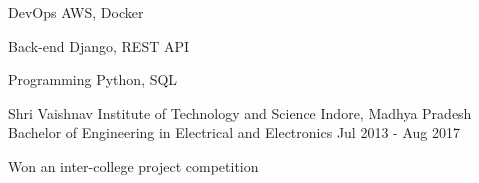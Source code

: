 \documentclass{my_resume}
\begin{document}
	\begin{cvskills}
		\cvskill
			{DevOps} %
			{AWS, Docker} %

		\cvskill
			{Back-end} %
			{Django, REST API} %

		\cvskill
			{Programming} %
			{Python, SQL} %
	\end{cvskills}


	\begin{cventries}
		\cventry
			{Shri Vaishnav Institute of Technology and Science} %
			{Indore, Madhya Pradesh} %
			{Bachelor of Engineering in Electrical and Electronics} %
			{Jul 2013 - Aug 2017} %

		\begin{cvitems} %
			\item {Won an inter-college project competition}
		\end{cvitems}
	\end{cventries}
\end{document}
